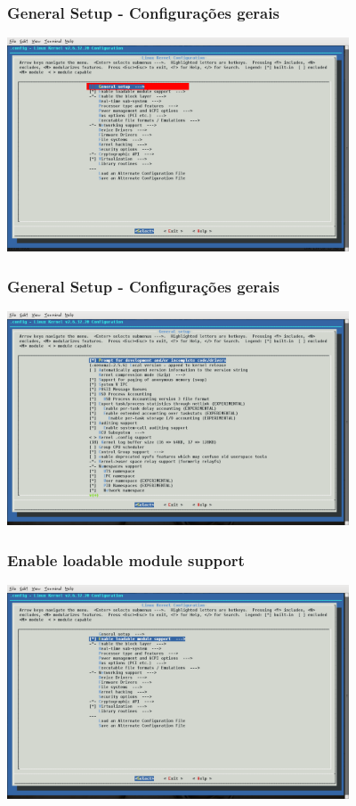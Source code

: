 \documentclass{beamer}
\begin{document}
\begin{frame}
 \frametitle{General Setup - Configurações gerais}
 \includegraphics[height = 2.5in, width = 4in]{images/GeneralSetupInit.png}
\end{frame}

\begin{frame}
 \frametitle{General Setup - Configurações gerais}
 \includegraphics[height = 2.5in, width = 4in]{images/GeneralSetup1.png}
\end{frame}

\begin{frame}
 \frametitle{Enable loadable module support}
 \includegraphics[height = 2.5in, width=4in]
  {images/EnableLoadableModuleSupport1.png}
\end{frame}
\end{document}
